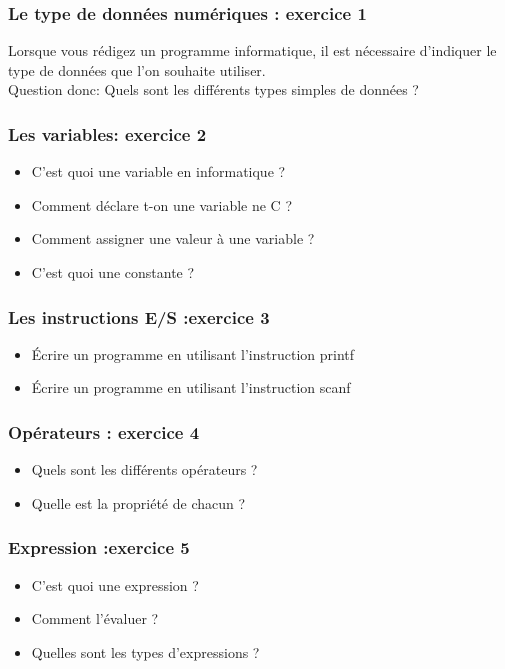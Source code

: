 \documentclass{beamer}
\begin{document}
 
\begin{frame}
\frametitle{Le type de données numériques : exercice 1}
Lorsque vous rédigez un programme informatique, il est nécessaire d'indiquer le type de données que l'on souhaite utiliser. \\
Question donc: Quels sont les différents types simples de données ?



\end{frame}

\begin{frame}
\frametitle{Les variables: exercice 2}
\begin{itemize}
\item C'est quoi une variable en informatique ?
\item Comment déclare t-on une variable ne C ?
\item Comment assigner une valeur à une variable ?
\item C'est quoi une constante ?
\end{itemize}
\end{frame}

\begin{frame}
\frametitle{Les instructions E/S :exercice 3}
\begin{itemize}
\item \'Ecrire un programme en utilisant l'instruction printf
\item \'Ecrire un programme en utilisant l'instruction scanf
\end{itemize}


\end{frame}
\begin{frame}
\frametitle{Opérateurs : exercice 4}
\begin{itemize}
\item Quels sont les différents opérateurs ?
\item Quelle est la propriété de chacun ?
\end{itemize}
\end{frame}

\begin{frame}
\frametitle{Expression :exercice 5}
\begin{itemize}
\item C'est quoi une expression ?
\item Comment l'évaluer ?
\item Quelles sont les types d'expressions ?
\end{itemize}
\end{frame}
\end{document}
